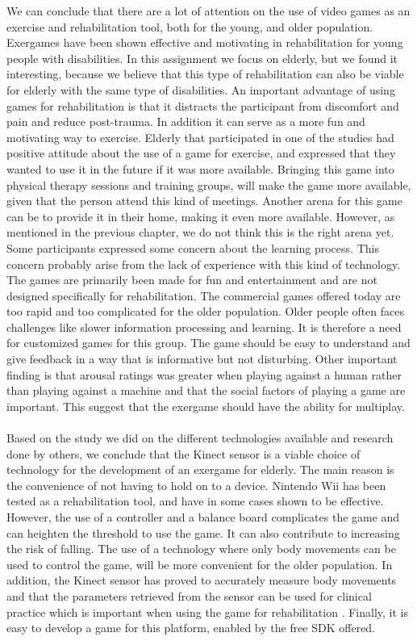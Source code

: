 We can conclude that there are a lot of attention on the use of video games as an exercise and rehabilitation tool, both for the young, and older population. Exergames have been shown effective and motivating in rehabilitation for young people with disabilities. In this assignment we focus on elderly, but we found it interesting, because we believe that  this type of rehabilitation can also be viable for elderly with the same type of disabilities. An important advantage of using games for rehabilitation is that it distracts the participant from discomfort and pain and reduce post-trauma. In addition it can serve as a more fun and motivating way to exercise. Elderly that participated in one of the studies had positive attitude about the use of a game for exercise, and expressed that they wanted to use it in the future if it was more available. Bringing this game into physical therapy sessions and training groups, will make the game more available, given that the  person attend this kind of meetings. Another arena for this game can be to provide it in their home, making it even more available. However, as mentioned in the previous chapter, we do not think this is the right arena yet.  Some participants  expressed some concern about the learning process. This concern probably arise from the lack of experience with this kind of technology.  The games are primarily been made for fun and entertainment and are not designed specifically for rehabilitation.  The commercial games offered today are too rapid and too complicated for the older population. Older people often faces challenges like slower information processing and learning. It is therefore a need for customized games for this group. The game should be easy to understand and give feedback in a way that is informative but not disturbing. Other important finding is that arousal ratings was greater when playing against a human rather than playing against a machine and that the social factors of playing a game are important. This suggest that the exergame should have the ability for multiplay.  \\ \\
Based on the study we did on the different technologies available and research done by others, we conclude that the Kinect sensor is a viable choice of technology for the development of an exergame for elderly. The main reason is the convenience of not having to hold on to a device. Nintendo Wii has been tested as a rehabilitation tool, and have in some cases shown to be effective. However, the use of a controller and a balance board complicates the game and can heighten the threshold to use the game. It can also contribute to increasing the risk of falling.  The use  of a technology where only body movements can be used to control the game, will be more convenient for the older population. In addition, the Kinect sensor has proved to accurately measure body movements and that the parameters retrieved from the sensor can be used for clinical practice which is important when using the game for rehabilitation .  Finally,  it is easy to develop a game for this platform, enabled by the free SDK offered.




